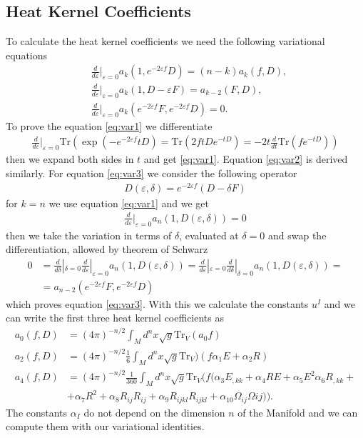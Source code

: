 \documentclass[a4paper]{article}
\theoremstyle{definition}
\theoremstyle{definition}
\theoremstyle{definition}
\theoremstyle{theorem}
\theoremstyle{theorem}
\theoremstyle{theorem}
\begin{document}
\subsection{Heat Kernel Coefficients}
To calculate the heat kernel coefficients we need the following variational
equations
\begin{align}
    &\frac{d}{d\varepsilon}|_{\varepsilon=0}a_k(1, e^{-2\varepsilon f}D) =
    (n-k) a_k(f, D),\label{eq:var1}\\
    &\frac{d}{d\varepsilon}|_{\varepsilon=0}a_k(1, D-\varepsilon F) =
    a_{k-2}(F,D),\label{eq:var2}\\
    &\frac{d}{d\varepsilon}|_{\varepsilon=0}a_k(e^{-2\varepsilon f}F,
    e^{-2\varepsilon f}D) =
    0\label{eq:var3}.
\end{align}
To prove the equation \ref{eq:var1} we differentiate
\begin{align}
    \frac{d}{d\varepsilon}|_{\varepsilon=0} \text{Tr}(\exp(-e^{-2\varepsilon
    f}tD) = \text{Tr}(2ftDe^{-tD}) = -2t\frac{d}{dt}\text{Tr}(fe^{-tD}))
\end{align}
then we expand both sides in $t$ and get \ref{eq:var1}. Equation \ref{eq:var2}
is derived similarly. For equation \ref{eq:var3} we consider the following
operator
\begin{align}
    D(\varepsilon,\delta) = e^{-2\varepsilon f}(D-\delta F)
\end{align}
for $k=n$ we use equation \ref{eq:var1} and we get
\begin{align}
    \frac{d}{d\varepsilon}|_{\varepsilon=0}a_n(1,D(\varepsilon,\delta)) =0
\end{align}
then we take the variation in terms of $\delta$, evaluated at $\delta =0$ and
swap the differentiation, allowed by theorem of Schwarz
\begin{align}
    0 &=
    \frac{d}{d\delta}|_{\delta=0}\frac{d}{d\varepsilon}|_{\varepsilon=0}a_n(1,
    D(\varepsilon,\delta)) =
    \frac{d}{d\varepsilon}|_{\varepsilon=0}\frac{d}{d\delta}|_{\delta=0}a_n(1,
    D(\varepsilon,\delta)) =\\
    &=a_{n-2} ( e^{-2\varepsilon f}F, e^{-2\varepsilon f}D)
\end{align}
which proves equation \ref{eq:var3}. With this we calculate the constants $u^I$
and we can write the first three heat kernel coefficients as
\begin{align}
    a_0(f, D) &= (4\pi)^{-n/2}\int_Md^n x\sqrt{g} \text{Tr}_V(a_0 f)\\
    a_2(f, D) &= (4\pi)^{-n/2}\frac{1}{6}\int_Md^n
    x\sqrt{g}\text{Tr}_V)(f\alpha _1 E+\alpha _2 R)\\
    a_4(f, D) &= (4\pi)^{-n/2}\frac{1}{360}\int_Md^n
    x\sqrt{g}\text{Tr}_V(f(\alpha_3 E_{,kk} + \alpha_4 RE + \alpha_5 E^2
    \alpha_6 R_{,kk} + \\
    &+\alpha_7 R^2 + \alpha_8 R_{ij}R_{ij} + \alpha_9
    R_{ijkl}R_{ijkl} +\alpha_{10} \Omega_{ij}\Omega{ij})).
\end{align}
The constants $\alpha_I$ do not depend on the dimension $n$ of the Manifold and
we can compute them with our variational identities.
\end{document}
